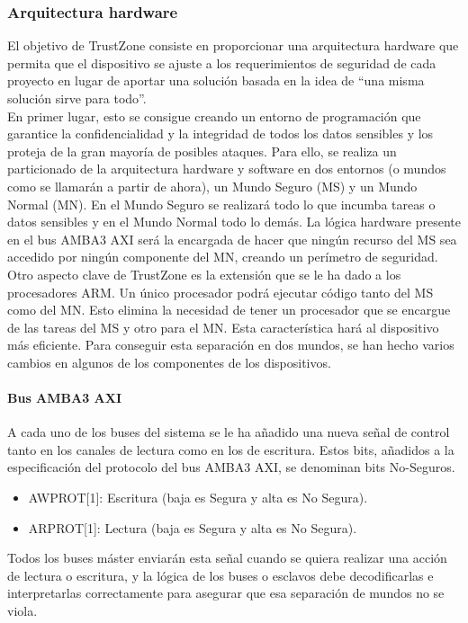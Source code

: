\subsubsection{Arquitectura hardware}
El objetivo de TrustZone consiste en proporcionar una arquitectura hardware que permita que el dispositivo se ajuste a los requerimientos de seguridad de cada proyecto en lugar de aportar una solución basada en la idea de “una misma solución sirve para todo”. \\
En primer lugar, esto se consigue creando un entorno de programación que garantice la confidencialidad y la integridad de todos los datos sensibles y los proteja de la gran mayoría de posibles ataques. Para ello, se realiza un particionado de la arquitectura hardware y software en dos entornos (o mundos como se llamarán a partir de ahora), un Mundo Seguro (MS) y un Mundo Normal (MN). En el Mundo Seguro se realizará todo lo que incumba tareas o datos sensibles y en el Mundo Normal todo lo demás. La lógica hardware presente en el bus AMBA3 AXI será la encargada de hacer que ningún recurso del MS sea accedido por ningún componente del MN, creando un perímetro de seguridad. \\
Otro aspecto clave de TrustZone es la extensión que se le ha dado a los procesadores ARM. Un único procesador podrá ejecutar código tanto del MS como del MN. Esto elimina la necesidad de tener un procesador que se encargue de las tareas del MS y otro para el MN. Esta característica hará al dispositivo más eficiente. 
Para conseguir esta separación en dos mundos, se han hecho varios cambios en algunos de los componentes de los dispositivos.


\paragraph{Bus AMBA3 AXI}
A cada uno de los buses del sistema se le ha añadido una nueva señal de control tanto en los canales de lectura como en los de escritura. Estos bits, añadidos a la especificación del protocolo del bus AMBA3 AXI, se denominan bits No-Seguros.
\begin{itemize}
	\item AWPROT[1]: Escritura (baja es Segura y alta es No Segura).
	\item ARPROT[1]: Lectura (baja es Segura y alta es No Segura).
\end{itemize}

Todos los buses máster enviarán esta señal cuando se quiera realizar una acción de lectura o escritura, y la lógica de los buses o esclavos debe decodificarlas e interpretarlas correctamente para asegurar que esa separación de mundos no se viola.

